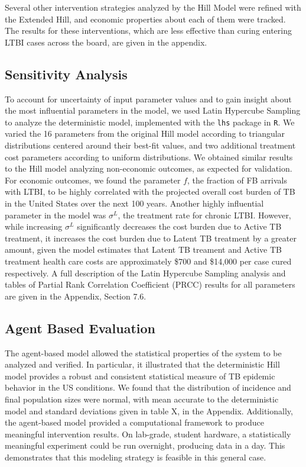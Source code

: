\documentclass{amsart}
\begin{document}
Several other intervention strategies analyzed by the Hill Model were refined
with the Extended Hill, and economic properties about each of them were tracked.
The results for these interventions, which are less effective than curing
entering LTBI cases across the board, are given in the appendix. 

\subsection{Sensitivity Analysis}
To account for uncertainty of input parameter values and to gain insight about
the most influential parameters in the model, we used Latin Hypercube Sampling
to analyze the deterministic model, implemented with the \texttt{lhs} package in
\texttt{R}.  We varied the 16 parameters from the original Hill model according
to triangular distributions centered around their best-fit values, and two
additional treatment cost parameters according to uniform distributions.  We
obtained similar results to the Hill model analyzing non-economic outcomes, as
expected for validation.  For economic outcomes, we found the parameter $f$, the
fraction of FB arrivals with LTBI, to be highly correlated with the projected
overall cost burden of TB in the United States over the next 100 years.  Another
highly influential parameter in the model was $\sigma^{L}$, the treatment rate
for chronic LTBI.  However, while increasing $\sigma^{L}$ significantly
decreases the cost burden due to Active TB treatment, it increases the cost
burden due to Latent TB treatment by a greater amount, given the model estimates
that Latent TB treament and Active TB treatment health care costs are
approximately \$700 and \$14,000 per case cured respectively.  A full
description of the Latin Hypercube Sampling analysis and tables of Partial Rank
Correlation Coefficient (PRCC) results for all parameters are given in the
Appendix, Section 7.6. 

\subsection{Agent Based Evaluation}
The agent-based model allowed the statistical properties of the system to be
analyzed and verified. In particular, it illustrated that the deterministic
Hill model provides a robust and consistent statistical measure of TB epidemic
behavior in the US conditions. We found that the distribution of incidence and
final population sizes were normal, with mean accurate to the deterministic
model and standard deviations given in table X, in the Appendix. Additionally,
the agent-based model provided a computational framework to produce
meaningful intervention results. On lab-grade, student hardware, a statistically
meaningful experiment could be run overnight, producing data in a day. This
demonstrates that this modeling strategy is feasible in this general case.
\end{document}
